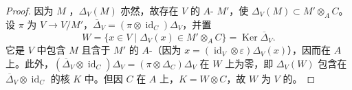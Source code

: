 \begin{proof}
因为 $M$ ，$\Delta_V(M)$ 亦然，故存在 $V$ 的 $A$- $M'$，使 $\Delta_V(M)\subset M'\otimes_A C$。设 $\pi$ 为 $V\to V/M'$，$\overline\Delta_V=(\pi\otimes\operatorname{id}_C)\Delta_V$，并置
\[
W=\{x\in V\mid\Delta_V(x)\in M'\otimes_A C\}=\operatorname{Ker}\overline\Delta_V.
\]
它是 $V$ 中包含 $M$ 且含于 $M'$ 的 $A$-（因为 $x=(\operatorname{id}_V\otimes\varepsilon)\Delta_V(x)$），因而在 $A$ 上。此外，$(\overline\Delta_V\otimes\operatorname{id}_C)\Delta_V=(\pi\otimes\Delta_C)\Delta_V$
在 $W$ 上为零，即 $\Delta_V(W)$ 包含在 $\overline\Delta_V\otimes\operatorname{id}_C$ 的核 $K$ 中。但因 $C$ 在 $A$ 上，$K=W\otimes C$，故 $W$ 为 $V$ 的。
\end{proof}

